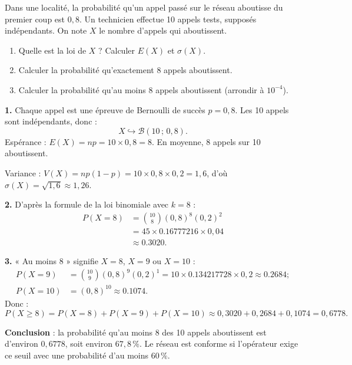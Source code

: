 \documentclass[11pt]{article}
\begin{document}
\begin{exoresolu}
Dans une localité, la probabilité qu'un appel passé sur le réseau aboutisse du premier coup est $0{,}8$. Un technicien effectue 10 appels tests, supposés indépendants. On note $X$ le nombre d'appels qui aboutissent.
\begin{enumerate}
\item Quelle est la loi de $X$ ? Calculer $E(X)$ et $\sigma(X)$.
\item Calculer la probabilité qu'exactement 8 appels aboutissent.
\item Calculer la probabilité qu'au moins 8 appels aboutissent (arrondir à $10^{-4}$).
\end{enumerate}
\tcblower
\textbf{1.} Chaque appel est une épreuve de Bernoulli de succès $p = 0{,}8$. Les 10 appels sont indépendants, donc :
\[ X \hookrightarrow \mathcal{B}(10\,;\,0{,}8). \]
Espérance : $E(X) = np = 10 \times 0{,}8 = 8$. En moyenne, 8 appels sur 10 aboutissent.

Variance : $V(X) = np(1-p) = 10 \times 0{,}8 \times 0{,}2 = 1{,}6$, d'où $\sigma(X) = \sqrt{1{,}6} \approx 1{,}26$.

\textbf{2.} D'après la formule de la loi binomiale avec $k = 8$ :
\begin{align*}
P(X = 8) &= \binom{10}{8} (0{,}8)^8 (0{,}2)^2 \\
&= 45 \times \num{0,16777216} \times 0{,}04 \\
&\approx \num{0,3020}.
\end{align*}

\textbf{3.} « Au moins 8 » signifie $X = 8$, $X = 9$ ou $X = 10$ :
\begin{align*}
P(X = 9) &= \binom{10}{9} (0{,}8)^9 (0{,}2)^1 = 10 \times \num{0,134217728} \times 0{,}2 \approx \num{0,2684} ; \\
P(X = 10) &= (0{,}8)^{10} \approx \num{0,1074}.
\end{align*}
Donc :
\[ P(X \geq 8) = P(X=8) + P(X=9) + P(X=10) \approx 0{,}3020 + 0{,}2684 + 0{,}1074 = 0{,}6778. \]

\textbf{Conclusion} : la probabilité qu'au moins 8 des 10 appels aboutissent est d'environ $0{,}6778$, soit environ $67{,}8\,\%$. Le réseau est conforme si l'opérateur exige ce seuil avec une probabilité d'au moins $60\,\%$.
\end{exoresolu}
\end{document}
